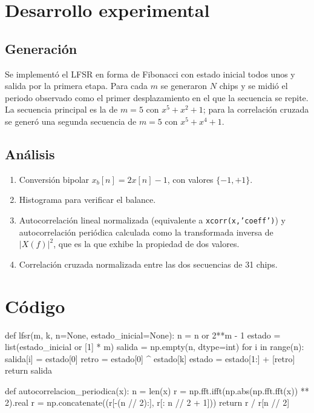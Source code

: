 \documentclass[11pt,a4paper]{article}
\begin{document}
\section{Desarrollo experimental}

\subsection{Generación}

Se implementó el LFSR en forma de Fibonacci con estado inicial todos unos y salida por la
primera etapa. Para cada $m$ se generaron $N$ chips y se midió el periodo observado como
el primer desplazamiento en el que la secuencia se repite. La secuencia principal es la de
$m=5$ con $x^5+x^2+1$; para la correlación cruzada se generó una segunda secuencia de
$m=5$ con $x^5+x^4+1$.

\subsection{Análisis}

\begin{enumerate}
  \item Conversión bipolar $x_b[n]=2x[n]-1$, con valores $\{-1,+1\}$.
  \item Histograma para verificar el balance.
  \item Autocorrelación lineal normalizada (equivalente a \texttt{xcorr(x,'coeff')}) y
        autocorrelación periódica calculada como la transformada inversa de
        $|X(f)|^2$, que es la que exhibe la propiedad de dos valores.
  \item Correlación cruzada normalizada entre las dos secuencias de 31 chips.
\end{enumerate}

\section{Código}

\begin{codigo}
def lfsr(m, k, n=None, estado_inicial=None):
    n = n or 2**m - 1
    estado = list(estado_inicial or [1] * m)
    salida = np.empty(n, dtype=int)
    for i in range(n):
        salida[i] = estado[0]
        retro = estado[0] ^ estado[k]
        estado = estado[1:] + [retro]
    return salida

def autocorrelacion_periodica(x):
    n = len(x)
    r = np.fft.ifft(np.abs(np.fft.fft(x)) ** 2).real
    r = np.concatenate((r[-(n // 2):], r[: n // 2 + 1]))
    return r / r[n // 2]
\end{codigo}
\end{document}
